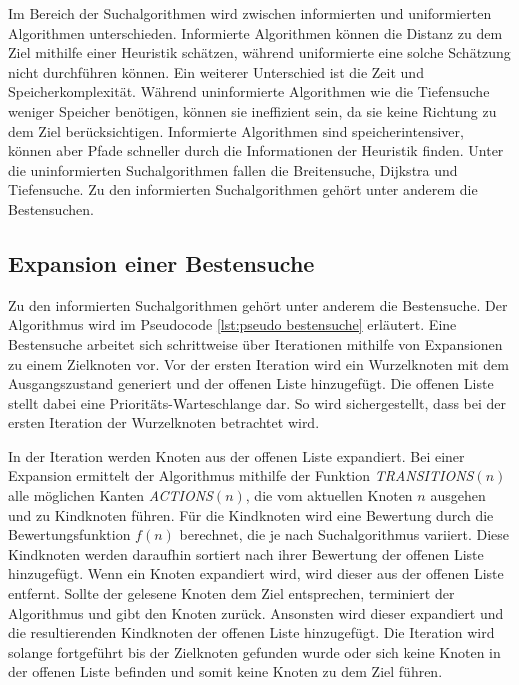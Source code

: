 Im Bereich der Suchalgorithmen wird zwischen informierten und uniformierten Algorithmen unterschieden. Informierte Algorithmen k\"{o}nnen die Distanz zu dem Ziel mithilfe einer Heuristik sch\"{a}tzen, w\"{a}hrend uniformierte eine solche Sch\"{a}tzung nicht durchf\"{u}hren k\"{o}nnen. Ein weiterer Unterschied ist die Zeit und Speicherkomplexit\"{a}t. W\"{a}hrend uninformierte Algorithmen wie die Tiefensuche weniger Speicher ben\"{o}tigen, k\"{o}nnen sie ineffizient sein, da sie keine Richtung zu dem Ziel ber\"{u}cksichtigen. Informierte Algorithmen sind speicherintensiver, k\"{o}nnen aber Pfade schneller durch die Informationen der Heuristik finden. Unter die uninformierten Suchalgorithmen fallen die Breitensuche, Dijkstra und Tiefensuche. Zu den informierten Suchalgorithmen geh\"{o}rt unter anderem die Bestensuchen.


\subsection{Expansion einer Bestensuche}
\label{chap:bestensuche}

Zu den informierten Suchalgorithmen geh\"{o}rt unter anderem die Bestensuche. Der Algorithmus wird im Pseudocode \ref{lst:pseudo bestensuche} erläutert. Eine Bestensuche arbeitet sich schrittweise \"{u}ber Iterationen mithilfe von Expansionen zu einem Zielknoten vor. Vor der ersten Iteration wird ein Wurzelknoten mit dem Ausgangszustand generiert und der offenen Liste hinzugef\"{u}gt. Die offenen Liste stellt dabei eine Priorit\"{ä}ts-Warteschlange dar. So wird sichergestellt, dass bei der ersten Iteration der Wurzelknoten betrachtet wird.

In der Iteration werden Knoten aus der offenen Liste expandiert. Bei einer Expansion ermittelt der Algorithmus mithilfe der Funktion \textit{TRANSITIONS}$(n)$ alle m\"{o}glichen Kanten \textit{ACTIONS}$(n)$, die vom aktuellen Knoten $n$ ausgehen und zu Kindknoten f\"{u}hren. F\"{u}r die Kindknoten wird eine Bewertung durch die Bewertungsfunktion $f(n)$ berechnet, die je nach Suchalgorithmus variiert. Diese Kindknoten werden daraufhin sortiert nach ihrer Bewertung der offenen Liste hinzugef\"{u}gt. Wenn ein Knoten expandiert wird, wird dieser aus der offenen Liste entfernt. Sollte der gelesene Knoten dem Ziel entsprechen, terminiert der Algorithmus und gibt den Knoten zur\"{u}ck. Ansonsten wird dieser expandiert und die resultierenden Kindknoten der offenen Liste hinzugef\"{u}gt. Die Iteration wird solange fortgef\"{u}hrt bis der Zielknoten gefunden wurde oder sich keine Knoten in der offenen Liste befinden und somit keine Knoten zu dem Ziel f\"{u}hren.

